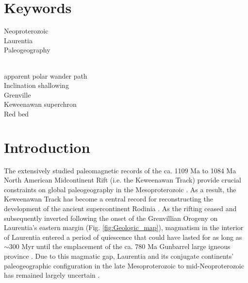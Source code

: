 \documentclass[draft]{agujournal2019}
\begin{document}


\section*{Keywords}
Neoproterozoic\\
Laurentia  \\
Paleogeography\\
\

apparent polar wander path\\
Inclination shallowing\\
Grenville\\
Keweenawan superchron\\
Red bed\\

\section*{Introduction}

The extensively studied paleomagnetic records of the ca. 1109 Ma to 1084 Ma North American Midcontinent Rift (i.e. the Keweenawan Track) provide crucial constraints on global paleogeography in the Mesoproterozoic \cite{Swanson-Hysell2019a}. As a result, the Keweenawan Track has become a central record for reconstructing the development of the ancient supercontinent Rodinia \cite{2021a}. As the rifting ceased and subsequently inverted following the onset of the Grenvillian Orogeny on Laurentia's eastern margin (Fig. \ref{fig:Geologic_map}), magmatism in the interior of Laurentia entered a period of quiescence that could have lasted for as long as $\sim$300 Myr until the emplacement of the ca. 780 Ma Gunbarrel large igneous province \cite{Harlan2003a, Mackinder2019a}. Due to this magmatic gap, Laurentia and its conjugate continents' paleogeographic configuration in the late Mesoproterozoic to mid-Neoproterozoic has remained largely uncertain \cite{Swanson-Hysell2021c}.
\end{document}
